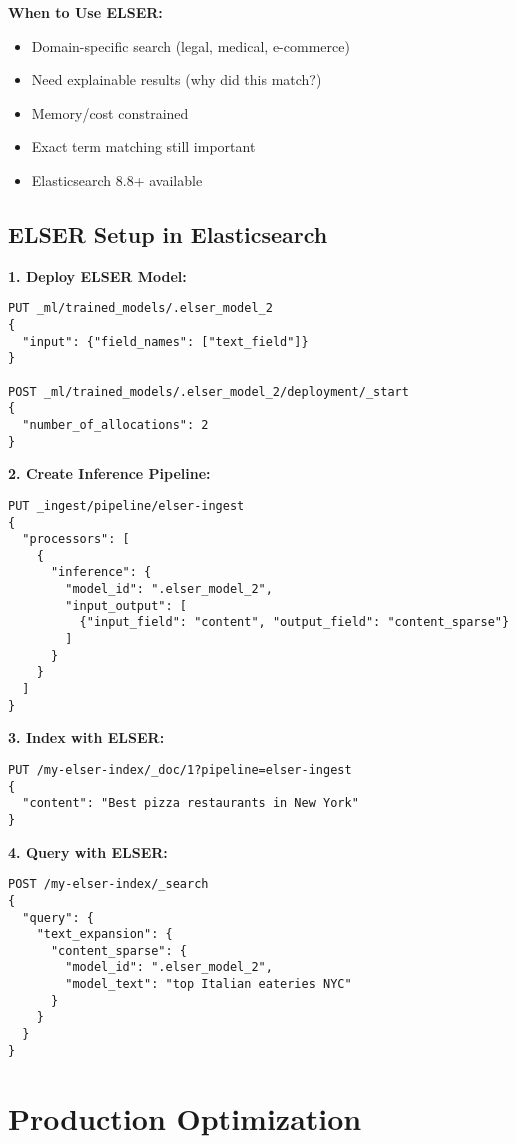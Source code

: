 \documentclass[10pt]{article}
\begin{document}
\textbf{When to Use ELSER:}
\begin{itemize}
\item Domain-specific search (legal, medical, e-commerce)
\item Need explainable results (why did this match?)
\item Memory/cost constrained
\item Exact term matching still important
\item Elasticsearch 8.8+ available
\end{itemize}

\subsection{ELSER Setup in Elasticsearch}

\textbf{1. Deploy ELSER Model:}
\begin{lstlisting}
PUT _ml/trained_models/.elser_model_2
{
  "input": {"field_names": ["text_field"]}
}

POST _ml/trained_models/.elser_model_2/deployment/_start
{
  "number_of_allocations": 2
}
\end{lstlisting}

\textbf{2. Create Inference Pipeline:}
\begin{lstlisting}
PUT _ingest/pipeline/elser-ingest
{
  "processors": [
    {
      "inference": {
        "model_id": ".elser_model_2",
        "input_output": [
          {"input_field": "content", "output_field": "content_sparse"}
        ]
      }
    }
  ]
}
\end{lstlisting}

\textbf{3. Index with ELSER:}
\begin{lstlisting}
PUT /my-elser-index/_doc/1?pipeline=elser-ingest
{
  "content": "Best pizza restaurants in New York"
}
\end{lstlisting}

\textbf{4. Query with ELSER:}
\begin{lstlisting}
POST /my-elser-index/_search
{
  "query": {
    "text_expansion": {
      "content_sparse": {
        "model_id": ".elser_model_2",
        "model_text": "top Italian eateries NYC"
      }
    }
  }
}
\end{lstlisting}

\section{Production Optimization}
\end{document}
